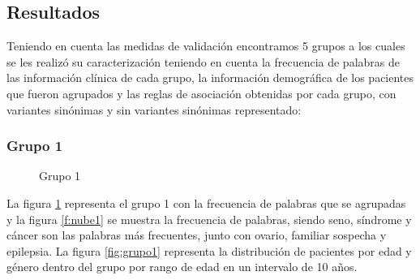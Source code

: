 \subsection{Resultados} 

Teniendo en cuenta las medidas de validación encontramos  5 grupos a los cuales se les realizó su caracterización teniendo en cuenta la frecuencia de palabras de las información clínica  de cada grupo, la información demográfica de los pacientes que fueron agrupados y las reglas de asociación obtenidas por cada grupo, con  variantes sinónimas y sin variantes sinónimas  representado: 

\subsubsection*{Grupo 1}

\begin{figure}[h!]
	\centering
	\caption{Grupo 1}
	\label{f:grupo11}
\end{figure} 


La figura \ref{f:grupo11} representa el grupo 1 con la frecuencia de palabras que se agrupadas y la figura \ref{f:nube1} se muestra la frecuencia de palabras, siendo seno, síndrome y cáncer son las palabras más frecuentes, junto con ovario, familiar sospecha y epilepsia. La figura \ref{fig:grupo1} representa la distribución de pacientes por edad y género dentro del grupo por rango de edad en un intervalo de 10 años. \\

